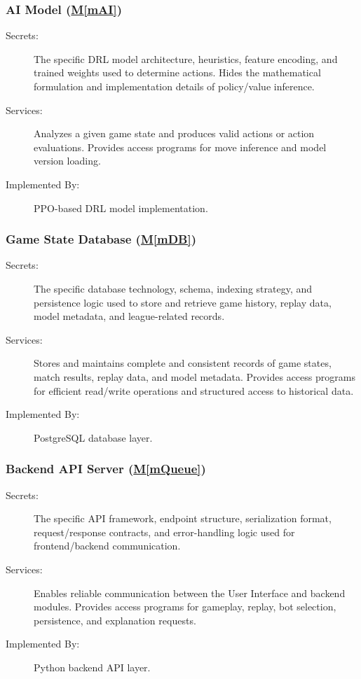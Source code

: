 \documentclass[12pt, titlepage]{article}
\newcommand{\mref}[1]{\hyperref[sec:#1]{M\ref*{#1}}}
\begin{document}
\subsubsection{AI Model (\mref{mAI})} \label{sec:mAI}
\begin{description}
\item[Secrets:] The specific DRL model architecture, heuristics, feature encoding, and trained weights used to determine actions.
Hides the mathematical formulation and implementation details of policy/value inference.
\item[Services:] Analyzes a given game state and produces valid actions or action evaluations.
Provides access programs for move inference and model version loading.
\item[Implemented By:] PPO-based DRL model implementation.
\end{description}

\subsubsection{Game State Database (\mref{mDB})} \label{sec:mDB}
\begin{description}
\item[Secrets:] The specific database technology, schema, indexing strategy, and persistence logic used to store and retrieve game history, replay data, model metadata, and league-related records.
\item[Services:] Stores and maintains complete and consistent records of game states, match results, replay data, and model metadata.
Provides access programs for efficient read/write operations and structured access to historical data.
\item[Implemented By:] PostgreSQL database layer.
\end{description}

\subsubsection{Backend API Server (\mref{mQueue})} \label{sec:mQueue}
\begin{description}
\item[Secrets:] The specific API framework, endpoint structure, serialization format, request/response contracts, and error-handling logic used for frontend/backend communication.
\item[Services:] Enables reliable communication between the User Interface and backend modules.
Provides access programs for gameplay, replay, bot selection, persistence, and explanation requests.
\item[Implemented By:] Python backend API layer.
\end{description}
\end{document}
